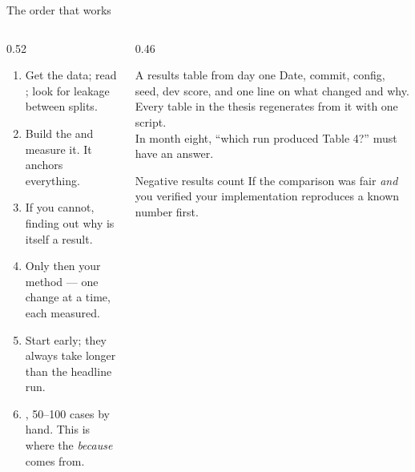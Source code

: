 \documentclass[aspectratio=169,11pt]{beamer}
\begin{document}
\begin{frame}{The order that works}
\begin{columns}[T]
\begin{column}{0.52\textwidth}
\begin{enumerate}
  \item Get the data; read ; look for leakage
        between splits.
  \item Build the  and measure it. It anchors
        everything.
  \item {} If you cannot, finding out why
        is itself a result.
  \item Only then your method --- one change at a time, each measured.
  \item {} Start early; they always take longer than the headline
        run.
  \item {}, 50--100 cases by hand. This is where the
        \emph{because} comes from.
\end{enumerate}
\end{column}
\begin{column}{0.46\textwidth}
\begin{block}{A results table from day one}
\footnotesize
Date, commit, config, seed, dev score, and one line on what changed and why.
Every table in the thesis regenerates from it with one script.\\[3pt]
In month eight, ``which run produced Table 4?'' must have an answer.
\end{block}
\begin{block}{Negative results count}
\footnotesize
If the comparison was fair \emph{and} you verified your implementation
reproduces a known number first.
\end{block}
\end{column}
\end{columns}
\end{frame}
\end{document}

